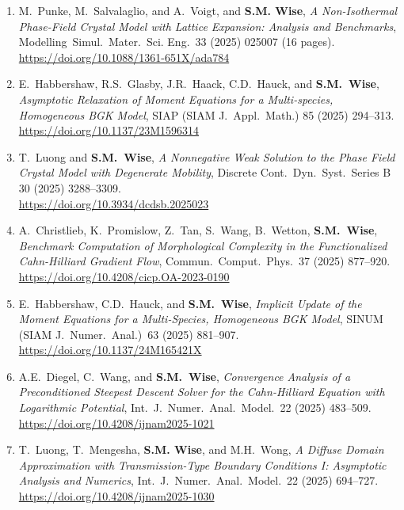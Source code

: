 \documentclass[11pt]{letter}
\begin{document}
\begin{enumerate}
	\item
M.~Punke, M.~Salvalaglio, and A.~Voigt, and \textbf{S.M. Wise}, {\sl A Non-Isothermal Phase-Field Crystal Model with Lattice Expansion: Analysis and Benchmarks}, Modelling~Simul.~Mater.~Sci. Eng.~33 (2025) 025007 (16 pages). 
	\\
\url{https://doi.org/10.1088/1361-651X/ada784}

	\item
E.~Habbershaw, R.S.~Glasby, J.R.~Haack, C.D.~Hauck, and \textbf{S.M.~Wise}, {\sl Asymptotic Relaxation of Moment Equations for a Multi-species, Homogeneous BGK Model}, SIAP (SIAM J.~Appl.~Math.) 85 (2025) 294--313.
	\\
\url{https://doi.org/10.1137/23M1596314}

	\item
T.~Luong and \textbf{S.M.~Wise}, {\sl A Nonnegative Weak Solution to the Phase Field Crystal Model with Degenerate Mobility}, Discrete Cont.~Dyn.~Syst.~Series B 30 (2025) 3288--3309.
	\\
\url{https://doi.org/10.3934/dcdsb.2025023}

	\item
A.~Christlieb, K.~Promislow, Z.~Tan, S.~Wang, B.~Wetton, \textbf{S.M.~Wise}, {\sl Benchmark Computation of Morphological Complexity in the Functionalized Cahn-Hilliard Gradient Flow}, Commun.~Comput.~Phys.~37 (2025) 877--920.
	\\ 
\url{https://doi.org/10.4208/cicp.OA-2023-0190}


	\item
E.~Habbershaw, C.D.~Hauck, and \textbf{S.M.~Wise}, {\sl Implicit Update of the Moment Equations for a Multi-Species, Homogeneous BGK Model}, SINUM (SIAM J.~Numer.~Anal.)~63 (2025) 881--907.
	\\
\url{https://doi.org/10.1137/24M165421X}

	\item
A.E.~Diegel, C.~Wang, and \textbf{S.M.~Wise}, {\sl Convergence Analysis of a Preconditioned Steepest Descent Solver for the Cahn-Hilliard Equation with Logarithmic Potential}, Int.~J.~Numer.~Anal.~Model.~22 (2025) 483--509.
	\\
\url{https://doi.org/10.4208/ijnam2025-1021}

	\item
T.~Luong, T.~Mengesha, \textbf{S.M. Wise}, and M.H.~Wong, {\sl  A Diffuse Domain Approximation with Transmission-Type Boundary Conditions I: Asymptotic Analysis and Numerics}, Int.~J.~Numer.~Anal.~Model.~22 (2025) 694--727.
	\\
\url{https://doi.org/10.4208/ijnam2025-1030}


\end{enumerate}
\end{document}

